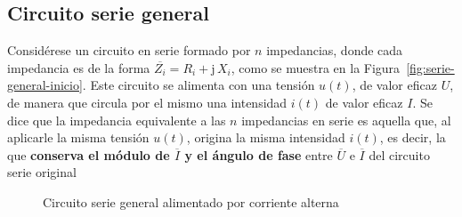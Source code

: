 \subsection{Circuito serie general}
Considérese un circuito en serie formado por $n$ impedancias, donde
cada impedancia es de la forma $\overline{Z_i}=R_i+\mathrm{j}\,X_i$,
como se muestra en la Figura~\ref{fig:serie-general-inicio}. Este
circuito se alimenta con una tensión $u(t)$, de valor eficaz $U$, de
manera que circula por el mismo una intensidad $i(t)$ de valor eficaz
$I$. Se dice que la impedancia equivalente a las $n$ impedancias en
serie es aquella que, al aplicarle la misma tensión $u(t)$, origina la
misma intensidad $i(t)$, es decir, la que \textbf{conserva el módulo
  de $\overline{I}$ y el ángulo de fase} entre $\overline{U}$ e
$\overline{I}$ del circuito serie original
\begin{figure}[H]
  \centering
  \hfil
  \caption{Circuito serie general alimentado por corriente alterna}
  \label{fig:serie-general}
\end{figure}
	
